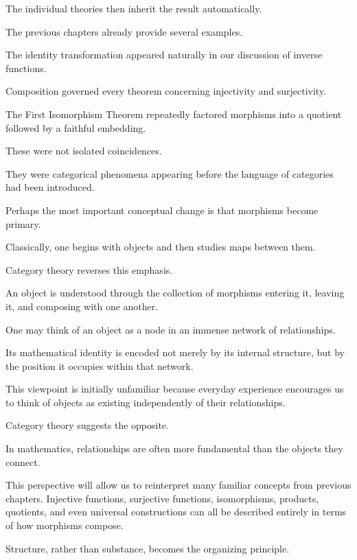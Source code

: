 \documentclass[11pt]{book}
\numberwithin{equation}{chapter}
\theoremstyle{definition}
\theoremstyle{plain}
\theoremstyle{remark}
\begin{document}
The individual theories then inherit the result automatically.

The previous chapters already provide several examples.

The identity transformation appeared naturally in our discussion of inverse functions.

Composition governed every theorem concerning injectivity and surjectivity.

The First Isomorphism Theorem repeatedly factored morphisms into a quotient followed by a faithful embedding.

These were not isolated coincidences.

They were categorical phenomena appearing before the language of categories had been introduced.

Perhaps the most important conceptual change is that morphisms become primary.

Classically, one begins with objects and then studies maps between them.

Category theory reverses this emphasis.

An object is understood through the collection of morphisms entering it, leaving it, and composing with one another.

One may think of an object as a node in an immense network of relationships.

Its mathematical identity is encoded not merely by its internal structure, but by the position it occupies within that network.

This viewpoint is initially unfamiliar because everyday experience encourages us to think of objects as existing independently of their relationships.

Category theory suggests the opposite.

In mathematics, relationships are often more fundamental than the objects they connect.

This perspective will allow us to reinterpret many familiar concepts from previous chapters. Injective functions, surjective functions, isomorphisms, products, quotients, and even universal constructions can all be described entirely in terms of how morphisms compose.

Structure, rather than substance, becomes the organizing principle.

\end{document}
